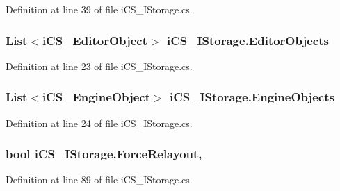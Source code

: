 Definition at line 39 of file i\+C\+S\+\_\+\+I\+Storage.\+cs.

\hypertarget{classi_c_s___i_storage_a3e4bd531361f5f6f3394bb5bf183c947}{
\subsubsection[{Editor\+Objects}]{\setlength{\rightskip}{0pt plus 5cm}List$<${\bf i\+C\+S\+\_\+\+Editor\+Object}$>$ i\+C\+S\+\_\+\+I\+Storage.\+Editor\+Objects\hspace{0.3cm}{\ttfamily [get]}}}\label{classi_c_s___i_storage_a3e4bd531361f5f6f3394bb5bf183c947}


Definition at line 23 of file i\+C\+S\+\_\+\+I\+Storage.\+cs.

\hypertarget{classi_c_s___i_storage_a9337d4a89b0fa806dace70151550c742}{
\subsubsection[{Engine\+Objects}]{\setlength{\rightskip}{0pt plus 5cm}List$<${\bf i\+C\+S\+\_\+\+Engine\+Object}$>$ i\+C\+S\+\_\+\+I\+Storage.\+Engine\+Objects\hspace{0.3cm}{\ttfamily [get]}}}\label{classi_c_s___i_storage_a9337d4a89b0fa806dace70151550c742}


Definition at line 24 of file i\+C\+S\+\_\+\+I\+Storage.\+cs.

\hypertarget{classi_c_s___i_storage_adb98b13f00c6064b061f36a69edfd254}{
\subsubsection[{Force\+Relayout}]{\setlength{\rightskip}{0pt plus 5cm}bool i\+C\+S\+\_\+\+I\+Storage.\+Force\+Relayout\hspace{0.3cm}{\ttfamily [get]}, {\ttfamily [set]}}}\label{classi_c_s___i_storage_adb98b13f00c6064b061f36a69edfd254}


Definition at line 89 of file i\+C\+S\+\_\+\+I\+Storage.\+cs.

